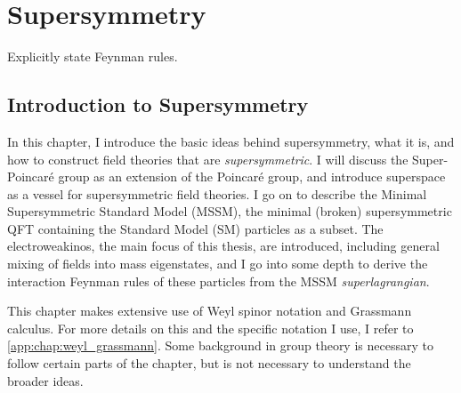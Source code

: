 \documentclass[../main.tex]{subfiles}
\begin{document}
\chapter{Supersymmetry}


\begin{TODO}
  \item Explicitly state Feynman rules.
\end{TODO}

\section{Introduction to Supersymmetry}
\label{susy:sec:introduction}
In this chapter, I introduce the basic ideas behind supersymmetry, what it is, and how to construct field theories that are \emph{supersymmetric}.
I will discuss the Super-Poincaré group as an extension of the Poincaré group, and introduce superspace as a vessel for supersymmetric field theories.
I go on to describe the Minimal Supersymmetric Standard Model (MSSM), the minimal (broken) supersymmetric QFT containing the Standard Model (SM) particles as a subset.
The electroweakinos, the main focus of this thesis, are introduced, including general mixing of fields into mass eigenstates, and I go into some depth to derive the interaction Feynman rules of these particles from the MSSM \emph{superlagrangian}.

This chapter makes extensive use of Weyl spinor notation and Grassmann calculus. For more details on this and the specific notation I use, I refer to \cref{app:chap:weyl_grassmann}.
Some background in group theory is necessary to follow certain parts of the chapter, but is not necessary to understand the broader ideas.
\end{document}
